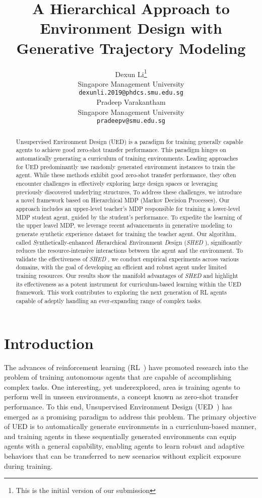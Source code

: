 \documentclass{article}
\title{A Hierarchical Approach to Environment Design with Generative Trajectory Modeling}
\author{%
  Dexun Li\thanks{This is the initial version of our submission} \\
  Singapore Management University\\
  \texttt{dexunli.2019@phdcs.smu.edu.sg} \\
  \And
  Pradeep Varakantham \\
  Singapore Management University \\
  \texttt{pradeepv@smu.edu.sg} \\
}
\newcommand\algo{\emph{SHED }}
\begin{document}
\maketitle


\begin{abstract}
Unsupervised Environment Design (UED) is a paradigm for training generally capable agents to achieve good zero-shot transfer performance. This paradigm hinges on automatically generating a curriculum of training environments. Leading approaches for UED predominantly use randomly generated environment instances to train the agent. While these methods exhibit good zero-shot transfer performance, they often encounter challenges in effectively exploring large design spaces or leveraging previously discovered underlying structures, To address these challenges, we introduce a novel framework based on Hierarchical MDP (Markov Decision Processes). Our approach includes an upper-level teacher's MDP responsible for training a lower-level MDP student agent, guided by the student's performance. To expedite the learning of the upper leavel MDP, we leverage recent advancements in generative modeling to  generate  synthetic experience dataset for training the teacher agent. Our algorithm, called \emph{S}ynthetically-enhanced \emph{H}ierarchical \emph{E}nvironment \emph{D}esign (\algo), significantly reduces the resource-intensive interactions between the agent and the environment.
To validate the effectiveness of \algo, we conduct empirical experiments across various domains, with the goal of developing an efficient and robust agent under limited training resources. Our results show the manifold advantages of \algo and highlight its effectiveness as a potent instrument for curriculum-based learning within the UED framework. This work contributes to exploring the next generation of RL agents capable of adeptly handling an ever-expanding range of complex tasks.
\end{abstract}



\section{Introduction}

The advances of reinforcement learning (RL~\cite{sutton1998introduction}) have promoted research into the problem of training autonomous agents that are capable of accomplishing complex tasks. One interesting, yet underexplored, area is training agents to perform well in unseen environments, a concept known as zero-shot transfer performance. To this end, Unsupervised Environment Design (UED~\cite{dennis2020emergent}) has emerged as a promising paradigm to address this problem. The primary objective of UED is to automatically generate environments in a curriculum-based manner, and training agents in these sequentially generated environments can equip agents with a general capability, enabling agents to learn robust and adaptive behaviors that can be transferred to new scenarios without explicit exposure during training.
\end{document}
